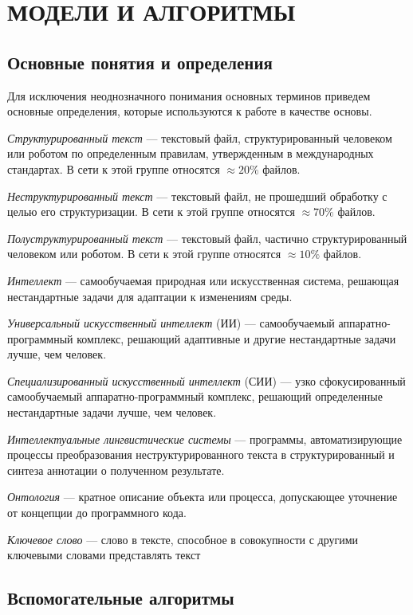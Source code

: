 \chapter{МОДЕЛИ И АЛГОРИТМЫ}

\section{Основные понятия и определения}

Для исключения неоднозначного понимания основных терминов приведем основные определения, которые используются к работе в качестве основы.

\textit{Структурированный текст} --- текстовый файл, структурированный человеком или роботом по определенным правилам, утвержденным в международных стандартах. В сети к этой группе относятся $\approx 20\%$ файлов.

\textit{Неструктурированный текст} --- текстовый файл, не прошедший обработку с целью его структуризации. В сети к этой группе относятся $\approx 70\%$ файлов.

\textit{Полуструктурированный текст} --- текстовый файл, частично структурированный человеком или роботом. В сети к этой группе относятся $\approx 10\%$ файлов.

\textit{Интеллект} --- самообучаемая природная или искусственная система, решающая нестандартные задачи для адаптации к изменениям среды.

\textit{Универсальный искусственный интеллект} (ИИ) --- самообучаемый аппаратно-программный комплекс, решающий адаптивные и другие нестандартные задачи лучше, чем человек.

\textit{Специализированный искусственный интеллект} (СИИ) --- узко сфокусированный самообучаемый аппаратно-программный комплекс, решающий определенные нестандартные задачи лучше, чем человек.

\textit{Интеллектуальные лингвистические системы} --- программы, автоматизирующие процессы преобразования неструктурированного текста в структурированный и синтеза аннотации о полученном результате.

\textit{Онтология} --- кратное описание объекта или процесса, допускающее уточнение от концепции до программного кода.   

\textit{Ключевое слово} --- слово в тексте, способное в совокупности с другими ключевыми словами представлять текст

\section{Вспомогательные алгоритмы}

